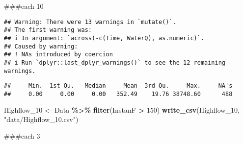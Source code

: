 \documentclass[
]{article}
\newenvironment{Shaded}{\begin{snugshade}}{\end{snugshade}}
\newcommand{\AttributeTok}[1]{\textcolor[rgb]{0.13,0.29,0.53}{#1}}
\newcommand{\DecValTok}[1]{\textcolor[rgb]{0.00,0.00,0.81}{#1}}
\newcommand{\FunctionTok}[1]{\textcolor[rgb]{0.13,0.29,0.53}{\textbf{#1}}}
\newcommand{\NormalTok}[1]{#1}
\newcommand{\OtherTok}[1]{\textcolor[rgb]{0.56,0.35,0.01}{#1}}
\newcommand{\SpecialCharTok}[1]{\textcolor[rgb]{0.81,0.36,0.00}{\textbf{#1}}}
\newcommand{\StringTok}[1]{\textcolor[rgb]{0.31,0.60,0.02}{#1}}
\begin{document}
\#\#\#each 10

\begin{Shaded}
\end{Shaded}

\begin{verbatim}
## Warning: There were 13 warnings in `mutate()`.
## The first warning was:
## i In argument: `across(-c(Time, WaterQ), as.numeric)`.
## Caused by warning:
## ! NAs introduced by coercion
## i Run `dplyr::last_dplyr_warnings()` to see the 12 remaining warnings.
\end{verbatim}

\begin{Shaded}
\end{Shaded}

\begin{verbatim}
##     Min.  1st Qu.   Median     Mean  3rd Qu.     Max.     NA's 
##     0.00     0.00     0.00   352.49    19.76 38748.60      488
\end{verbatim}

\begin{Shaded}
\begin{Highlighting}[]
\NormalTok{Highflow\_10 }\OtherTok{\textless{}{-}}\NormalTok{ Data }\SpecialCharTok{\%\textgreater{}\%} \FunctionTok{filter}\NormalTok{(InstanF }\SpecialCharTok{\textgreater{}} \DecValTok{150}\NormalTok{)}
\FunctionTok{write\_csv}\NormalTok{(Highflow\_10, }\StringTok{"data/Highflow\_10.csv"}\NormalTok{)}
\end{Highlighting}
\end{Shaded}

\#\#\#each 3
\end{document}

